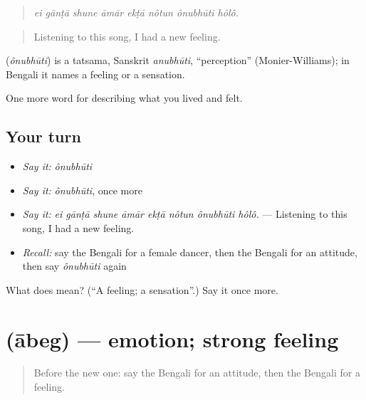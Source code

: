 \begin{quote}
\emph{ei gānṭā shune āmār ekṭā nôtun ônubhūti hôlô.}
\end{quote}

\begin{quote}
Listening to this song, I had a new feeling.
\end{quote}

\begin{cousinweb}
\textbf{} (\emph{ônubhūti}) is a tatsama, Sanskrit \emph{anubhūti}, \textquotedblleft{}perception\textquotedblright{} (Monier-Williams); in Bengali it names a feeling or a sensation.
\end{cousinweb}

\begin{grammarlens}[title={What you've built}]
One more word for describing what you lived and felt.
\end{grammarlens}

\subsection*{Your turn}
\begin{itemize}
\raggedright
  \item \emph{Say it:} \emph{ônubhūti}
  \item \emph{Say it:} \emph{ônubhūti}, once more
  \item \emph{Say it:} \emph{ei gānṭā shune āmār ekṭā nôtun ônubhūti hôlô.} — Listening to this song, I had a new feeling.
  \item \emph{Recall:} say the Bengali for a female dancer, then the Bengali for an attitude, then say \emph{ônubhūti} again
\end{itemize}

\begin{tcolorbox}[breakable,colback=teal!4,colframe=teal!35!black,title={Before you move on}]
What does  mean? (\textquotedblleft{}A feeling; a sensation\textquotedblright{}.) Say it once more.
\end{tcolorbox}
\section[\texorpdfstring{\bn{আবেগ} (ābeg)}{আবেগ (ābeg)}]{ (ābeg) — emotion; strong feeling}

\label{lesson:BN-C438-abeg}



\begin{quote}
Before the new one: say the Bengali for an attitude, then the Bengali for a feeling.
\end{quote}

